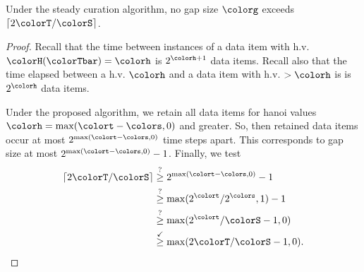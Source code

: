 \begin{theorem}
\label{thm:steady-gap-size}
Under the steady curation algorithm, no gap size $\colorg$ exceeds $\left\lceil 2 \colorT / \colorS \right\rceil$.
\end{theorem}
\begin{proof}
Recall that the time between instances of a data item with h.v. $\colorH(\colorTbar) = \colorh$ is $2^{\colorh + 1}$ data items.
Recall also that the time elapsed between a h.v. $\colorh$ and a data item with h.v. $>\colorh$ is is $2^{\colorh}$ data items.

Under the proposed algorithm, we retain all data items for hanoi values $\colorh = \max (\colort - \colors, 0)$ and greater.
So, then retained data items occur at most $2^{\max(\colort - \colors, 0)}$ time steps apart.
This corresponds to gap size at most $2^{\max(\colort - \colors, 0)} - 1$.
Finally, we test
\begin{align*}
\left\lceil 2 \colorT / \colorS \right\rceil
&\stackrel{?}{\geq}
2^{\max(\colort - \colors, 0)} - 1\\
&\stackrel{?}{\geq}
\max(2^{\colort} / 2^{\colors}, 1) - 1\\
&\stackrel{?}{\geq}
\max(2^{\colort} / \colorS - 1, 0)\\
&\stackrel{\checkmark}{\geq}
\max(2\colorT / \colorS - 1, 0).
\end{align*}
\end{proof}




